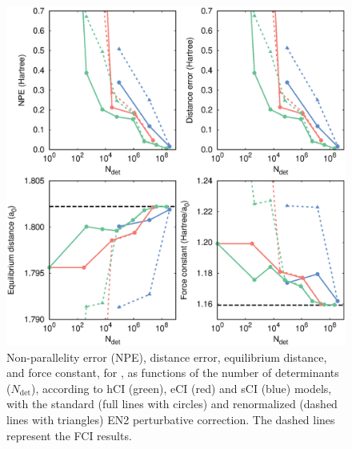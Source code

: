 \documentclass[aip,jcp,preprint,noshowkeys,superscriptaddress]{revtex4-1}
\newcommand{\Ndet}{N_\text{det}}
\begin{document}
\begin{figure}%
\includegraphics[width=1.0\linewidth]{plot_pt2_rpt2_H8}
\caption{
Non-parallelity error (NPE), distance error, equilibrium distance, and force constant, for ,
as functions of the number of determinants ($\Ndet$), according to hCI (green), eCI (red) and sCI (blue) models,
with the standard (full lines with circles) and renormalized (dashed lines with triangles) EN2 perturbative correction.
The dashed lines represent the FCI results.}
\label{fig:plot_pt2_rpt2_h8}
\end{figure}


\clearpage


\end{document}
